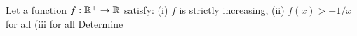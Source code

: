 Let a function $f : \Bbb{R}^+ \to \Bbb{R}$ satisfy:
(i) $f$ is strictly increasing,
(ii) $f(x) > -1/x$ for all 
(iii for all 
Determine 